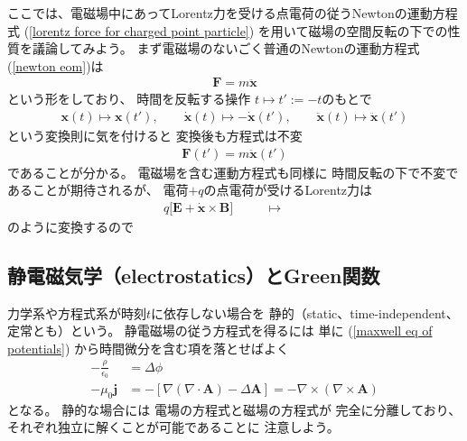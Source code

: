 ここでは、電磁場中にあってLorentz力を受ける点電荷の従うNewtonの運動方程式
(\ref{lorentz force for charged point particle})
を用いて磁場の空間反転の下での性質を議論してみよう。
まず電磁場のないごく普通のNewtonの運動方程式(\ref{newton eom})は
\begin{align}
  \bm{F} = m \ddot{ \bm{x} }
\end{align}
という形をしており、
時間を反転する操作
$t \mapsto t' := - t$のもとで
\begin{align}
  \bm{x}(t)
  \mapsto \bm{x}(t')
,\qquad
  \dot{ \bm{x} }(t)
  \mapsto - \dot{ \bm{x} }(t')
,\qquad
  \ddot{ \bm{x} }(t)
  \mapsto \ddot{ \bm{x} }(t')
\end{align}
という変換則に気を付けると
変換後も方程式は不変
\begin{align}
  \bm{F}(t') = m \ddot{ \bm{x} }(t')
\end{align}
であることが分かる。
電磁場を含む運動方程式も同様に
時間反転の下で不変であることが期待されるが、
電荷$+q$の点電荷が受けるLorentz力は
\begin{align}
  q \Big[
    \bm{E}
  +
   \dot{\bm{x}}
    \times
    \bm{B}
  \Big]
&\qquad \mapsto \qquad
\end{align}
のように変換するので

\subsection{静電磁気学（electrostatics）とGreen関数}

力学系や方程式系が時刻$t$に依存しない場合を
静的（static、time-independent、定常とも）という。
静電磁場の従う方程式を得るには
単に
(\ref{maxwell eq of potentials})
から時間微分を含む項を落とせばよく
\begin{subequations}
\begin{align}
  - \frac{\rho}{\epsilon_0}
&=
  \Delta \phi
\label{static eq for ele-mag scalar potential}
\\
  - \mu_0 \bm{j}
&=
  - [
    \nabla
    ( \nabla \cdot \bm{A} )
  -
    \Delta \bm{A}
  ]
=
  - \nabla \times
    (\nabla \times \bm{A})
\label{static eq for ele-mag vector potential}
\end{align}
\end{subequations}
となる。
静的な場合には
電場の方程式と磁場の方程式が
完全に分離しており、
それぞれ独立に解くことが可能であることに
注意しよう。

